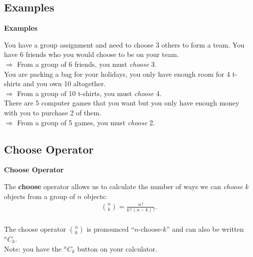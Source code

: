 \documentclass[compress]{beamer}        %
\makeatletter
\newcommand{\tcb}{\textcolor{beamer@blendedblue}}
\makeatother
\begin{document}
\subsection{Examples}
\begin{frame}{\bf \tcb{Examples}}

You have a group assignment and need to choose 3 others to form a team. You have 6 friends who you would choose to be on your team.\\[0.2cm]
$\Rightarrow$ From a group of 6 friends, you must \emph{choose} 3.\\[0.8cm]

You are packing a bag for your holidays, you only have enough room for 4 t-shirts and you own 10 altogether.\\[0.2cm]
$\Rightarrow$  From a group of 10 t-shirts, you must \emph{choose} 4.\\[0.8cm]

There are 5 computer games that you want but you only have enough money with you to purchase 2 of them.\\[0.2cm]
$\Rightarrow$  From a group of 5 games, you must \emph{choose} 2.

\end{frame}






\subsection{Choose Operator}
\begin{frame}{\bf \tcb{Choose Operator}}

The {\bf choose} operator allows us to calculate the number of ways we can \emph{choose} $k$ objects from a group of $n$ objects:\\[-0.1cm]

\begin{align*}
\boxed{\binom{n}{k} = \frac{n\,!}{k\,! \, (n-k)\,!}}.\\
\end{align*}

The choose operator $\binom{n}{k}$ is pronounced ``$n$-choose-$k$'' and can also be written  $^n C _k$. \\[0.6cm]
Note: you have the $\boxed{^n C _k}$ button on your calculator.

\end{frame}
\end{document}
